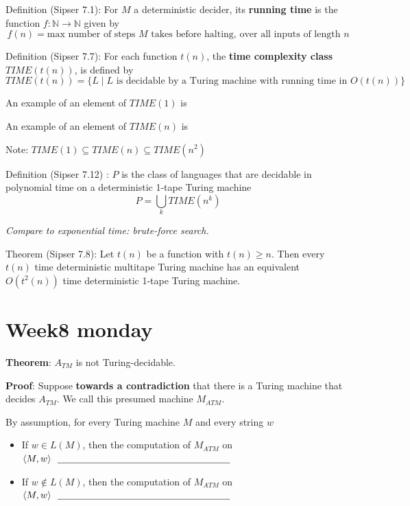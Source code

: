 \documentclass[12pt, oneside]{article}
\begin{document}
\vfill

Definition  (Sipser 7.1): For  $M$ a deterministic decider, its {\bf running time} is the function  $f: \mathbb{N} \to \mathbb{N}$
given  by
\[
f(n) =  \text{max number of  steps $M$ takes before halting, over all inputs  of length $n$}
\]

Definition (Sipser 7.7): For each function $t(n)$, the {\bf time complexity class}  $TIME(t(n))$, is defined  by
\[
TIME( t(n)) = \{ L \mid \text{$L$ is decidable by  a Turing machine with running time in  $O(t(n))$} \}
\]

An example of an element of  $TIME(  1  )$ is 

An example of an element of  $TIME(  n  )$ is 


Note: $TIME( 1) \subseteq TIME (n)  \subseteq TIME(n^2)$

\vfill

Definition (Sipser 7.12) : $P$ is the class of languages that  are decidable in polynomial time on 
a deterministic 1-tape  Turing  machine
\[
P  =  \bigcup_k TIME(n^k)
\]

{\it Compare to exponential time: brute-force search.}


Theorem (Sipser 7.8): Let $t(n)$ be a  function with  $t(n)  \geq n$.  Then every $t(n)$ time deterministic 
multitape Turing machine has an equivalent $O(t^2(n))$ time deterministic 1-tape Turing machine.

\newpage \vfill
\section*{Week8 monday}



{\bf  Theorem}: $A_{TM}$  is  not  Turing-decidable.

{\bf  Proof}: Suppose {\bf towards a  contradiction}  that there  is a Turing machine  that decides $A_{TM}$.  
We call this presumed machine  $M_{ATM}$.

By  assumption, for every  Turing machine  $M$ and every  string $w$

\begin{itemize}
\item If $w \in L(M)$, then  the computation of $M_{ATM}$  on  $\langle M,w \rangle ~~ \underline{\phantom{\hspace{2.5in}}}$
\item If $w \notin L(M)$, then  the computation of $M_{ATM}$  on  $\langle M,w \rangle ~~ \underline{\phantom{\hspace{2.5in}}}$
\end{itemize}
\end{document}
